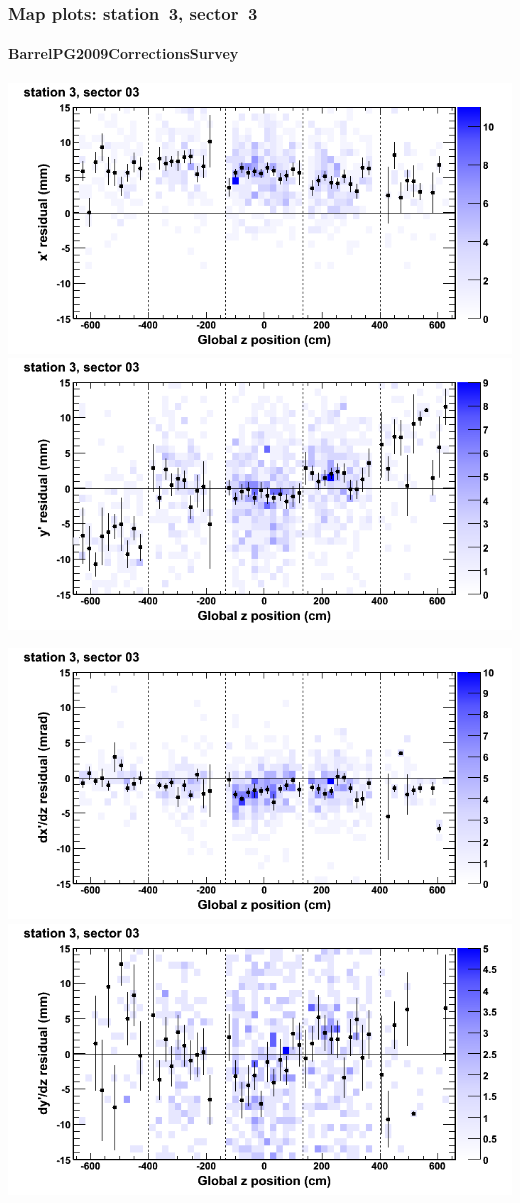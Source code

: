 \documentclass[compress]{beamer}
\begin{document}
\begin{frame}
\frametitle{Map plots: station~3, sector~3}
\framesubtitle{BarrelPG2009CorrectionsSurvey}
\includegraphics[width=0.5\linewidth]{mapplots_01/DTvsz_st3sec03_x.png}
\includegraphics[width=0.5\linewidth]{mapplots_01/DTvsz_st3sec03_y.png}

\includegraphics[width=0.5\linewidth]{mapplots_01/DTvsz_st3sec03_dxdz.png}
\includegraphics[width=0.5\linewidth]{mapplots_01/DTvsz_st3sec03_dydz.png}
\end{frame}
\end{document}
